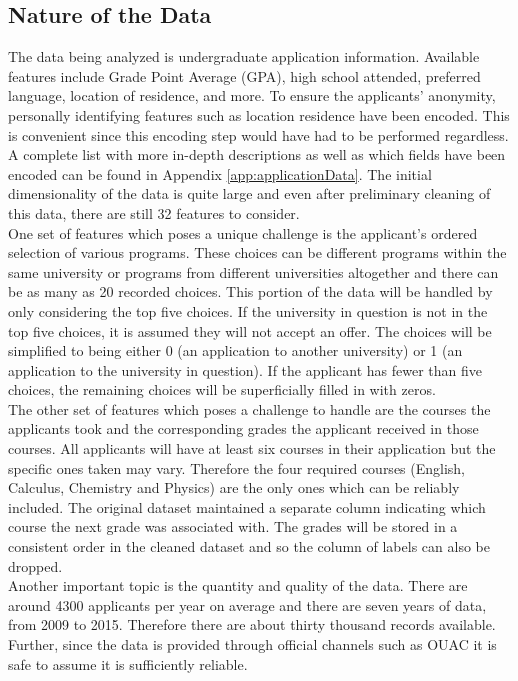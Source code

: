 \documentclass[titlepage]{article}
\begin{document}
\subsection{Nature of the Data}
The data being analyzed is undergraduate application information. Available features include Grade Point Average (GPA), high school attended, preferred language, location of residence, and more. To ensure the applicants' anonymity, personally identifying features such as location residence have been encoded. This is convenient since this encoding step would have had to be performed regardless. A complete list with more in-depth descriptions as well as which fields have been encoded can be found in Appendix \ref{app:applicationData}. The initial dimensionality of the data is quite large and even after preliminary cleaning of this data, there are still 32 features to consider.\\
One set of features which poses a unique challenge is the applicant's ordered selection of various programs. These choices can be different programs within the same university or programs from different universities altogether and there can be as many as 20 recorded choices. This portion of the data will be handled by only considering the top five choices. If the university in question is not in the top five choices, it is assumed they will not accept an offer. The choices will be simplified to being either 0 (an application to another university) or 1 (an application to the university in question). If the applicant has fewer than five choices, the remaining choices will be superficially filled in with zeros.\\
The other set of features which poses a challenge to handle are the courses the applicants took and the corresponding grades the applicant received in those courses. All applicants will have at least six courses in their application but the specific ones taken may vary. Therefore the four required courses (English, Calculus, Chemistry and Physics) are the only ones which can be reliably included. The original dataset maintained a separate column indicating which course the next grade was associated with. The grades will be stored in a consistent order in the cleaned dataset and so the column of labels can also be dropped.\\
Another important topic is the quantity and quality of the data. There are around 4300 applicants per year on average and there are seven years of data, from 2009 to 2015. Therefore there are about thirty thousand records available. Further, since the data is provided through official channels such as OUAC it is safe to assume it is sufficiently reliable.
\end{document}
